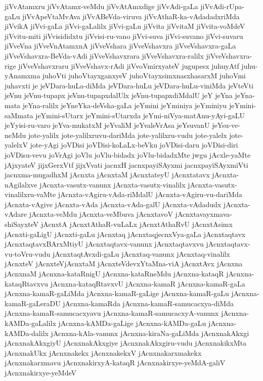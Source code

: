 {jiVvAtamxru
jiVvAtamx-veMdu
jiVvAtAmxdige
jiVvAdi-gaLa
jiVvAdi-rUpa-gaLu
jiVvApeVtaMvAva
jiVvABeVda-viruva
jiVvAthaR-ka-vAdadadxriMda
jiVvikA
jiVvi-gaLa
jiVvi-gaLalilx
jiVvi-gaLu
jiVvita
jiVvitaM
jiVvita-voMdeV
jiVvitu-miti
jiVvisididxtu
jiVvisi-ru-vano
jiVvi-suva
jiVvi-suvano
jiVvi-suvaru
jiVveVna
jiVveVnAtamxnA
jiVveVshara
jiVveVshavxra
jiVveVshavxra-gaLa
jiVveVshavxra-BeVda-vAdi
jiVveVshavxrara
jiVveVshavxra-ralilx
jiVveVshavxra-rige
jiVveVshavxraru
jiVveVshavx-rAdi
jiVvoVmirxyateV
jugupesx
juhuyAtf
juhu-yAnamxma
juhoVti
juhoVtayxganxyeV
juhoVtayxsimxnasxhasarxM
juhoVmi
juhavxti
je
jeVDara-huLa-diMda
jeVDara-huLu
jeVDara-huLu-viniMda
jeVteVti
jeVnu
jeVnu-tupapx
jeVnu-tupapxdalUlx
jeVnu-tupapxdiMdalU
jeY
jeYna
jeYna-mata
jeYna-ralilx
jeYneYka-deVsha-gaLa
jeYmini
jeYminiya
jeYminiyu
jeYmini-saMmata
jeYmini-sUtarx
jeYmini-sUtarxda
jeYmi-niVya-matAnu-yAyi-gaLU
jeYyisi-ru-varo
jeYva-mukatxM
jeYvaliM
jeYvaleVrAsa
jeYsuvanU
jeYsu-ve-neMdu
jote-yalilx
jote-yalilxruvu-dariMda
jote-yalilxru-vudu
jote-yalelx
jote-yalelxV
jote-yAgi
joVDisi
joVDisi-koLaLx-beVku
joVDisi-daru
joVDisi-diri
joVDisu-vevu
joVrAgi
joVlu
joVlu-bidadx
joVlu-bidadxMte
jwgu
jAcxle-yaMte
jAjxyateV
jijxGerxVtf
jijxVvati
jacnxH
jacnxpayiSAyxmi
jacnxpayiSAyxmiVti
jacnxma-mugadhxM
jAcnxta
jAcnxtaM
jAcnxtateyU
jAcnxtatavx
jAcnxta-nAgilalxve
jAcnxta-vasutx-vanunx
jAcnxta-vasutx-vinalilx
jAcnxta-vasutx-vinalilxru-vaMte
jAcnxta-vAgiru-vAda-riMdalU
jAcnxta-vAgiru-vu-dariMda
jAcnxta-vAgive
jAcnxta-vAda
jAcnxta-vAda-galU
jAcnxta-vAdadudx
jAcnxta-vAdare
jAcnxta-veMdu
jAcnxta-veMbuva
jAcnxtavoV
jAcnxtavayxmava-shiSayxteV
jAcnxtA
jAcnxtAthaR-vuLaLx
jAcnxtAthaRvU
jAcnxtAsimx
jAcnxti-gaLigU
jAcnxti-gaLu
jAcnxtaq
jAcnxtaqjecnxVya-gaLa
jAcnxtaqtavx
jAcnxtaqtavxBArxMtiyU
jAcnxtaqtavx-vanunx
jAcnxtaqtavxvu
jAcnxtaqtavx-vu-toVru-vudu
jAcnxtaqtAvxdi-gaLu
jAcnxtaq-vanunx
jAcnxtaq-vinalilx
jAcnxteV
jAcnxteVjAcnxtaM
jAcnxteVdevxYtaMna-viA
jAcnxtAvx
jAcnxna
jAcnxnaM
jAcnxna-kataRnigU
jAcnxna-kataRneMdu
jAcnxna-kataqR
jAcnxna-kataqRtavxvu
jAcnxna-kataqRtavxvU
jAcnxna-kamaR
jAcnxna-kamaR-gaLa
jAcnxna-kamaR-gaLiMda
jAcnxna-kamaR-gaLige
jAcnxna-kamaR-gaLu
jAcnxna-kamaR-gaLeraDU
jAcnxna-kamaRda
jAcnxna-kamaR-samucacxya-diMda
jAcnxna-kamaR-samucacxyavu
jAcnxna-kamaR-samucacxyA-vanunx
jAcnxna-kAMDa-gaLalilx
jAcnxna-kAMDa-gaLige
jAcnxna-kAMDa-gaLu
jAcnxna-kAMDa-dalilx
jAcnxna-kAla-vanunx
jAcnxna-kiraNa-gaLiMda
jAcnxnakAkxgi
jAcnxnakAkxgiyU
jAcnxnakAkxgiye
jAcnxnakAkxgiru-vudu
jAcnxnakikxMta
jAcnxnakUkx
jAcnxnakekx
jAcnxnakekxV
jAcnxnakarxmakekx
jAcnxnakarxmavu
jAcnxnakirxyA-kataqR
jAcnxnakirxye-yeMdA-galiV
jAcnxnakirxye-yeMdeV
}
